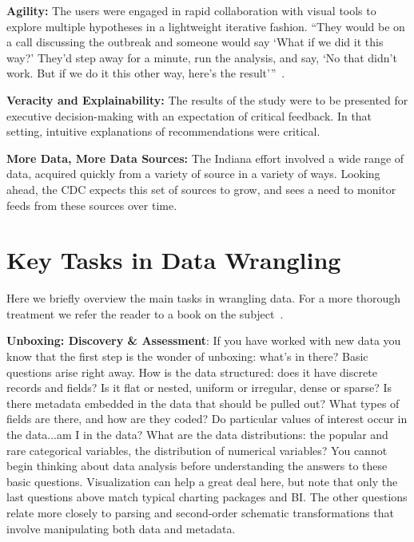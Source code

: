 \documentclass[11pt]{article}
\newcommand{\smallitem}[1]{\vspace{0.3em}\noindent\textbf{#1}}
\newcommand{\smallitembot}{\vspace{0.5em}\noindent}
\begin{document}
    \smallitem{Agility:} The users were engaged in rapid collaboration with visual tools to explore multiple hypotheses in a lightweight iterative fashion. ``They would be on a call discussing the outbreak and someone would say `What if we did it this way?' They'd step away for a minute, run the analysis, and say, `No that didn't work. But if we do it this other way, here's the result'''~\cite{datanami}.
    
    \smallitem{Veracity and Explainability:} The results of the study were to be presented for executive decision-making with an expectation of critical feedback. In that setting, intuitive explanations of recommendations were critical.
    
    \smallitem{More Data, More Data Sources:} The Indiana effort involved a wide range of data, acquired quickly from a variety of source in a variety of ways. Looking ahead, the CDC expects this set of sources to grow, and sees a need to monitor feeds from these sources over time.
\smallitembot

\section{Key Tasks in Data Wrangling}
Here we briefly overview the main tasks in wrangling data. For a more thorough treatment we refer the reader to a book on the subject~\cite{rattenbury2015data}.

\smallitem{Unboxing: Discovery \& Assessment}: If you have worked with new data you know that the first step is the wonder of unboxing: what's in there? Basic questions arise right away. How is the data structured: does it have discrete records and fields? Is it flat or nested, uniform or irregular, dense or sparse? Is there metadata embedded in the data that should be pulled out? What types of fields are there, and how are they coded? Do particular values of interest occur in the data...am I in the data? What are the data distributions: the popular and rare categorical variables, the distribution of numerical variables?   You cannot begin thinking about data analysis before understanding the answers to these basic questions. Visualization can help a great deal here, but note that only the last questions above match typical charting packages and BI. The other questions relate more closely to parsing and second-order schematic transformations that involve manipulating both data and metadata.
\end{document}
